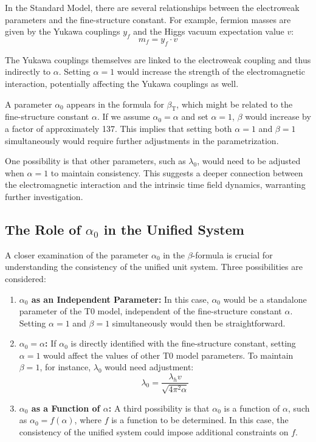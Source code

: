 ﻿\documentclass[12pt,a4paper]{article}
\newcommand{\betaT}{\beta_{\text{T}}}
\begin{document}
	In the Standard Model, there are several relationships between the electroweak parameters and the fine-structure constant. For example, fermion masses are given by the Yukawa couplings \(y_f\) and the Higgs vacuum expectation value \(v\):
	\begin{equation}
		m_f = y_f \cdot v
	\end{equation}
	
	The Yukawa couplings themselves are linked to the electroweak coupling and thus indirectly to \(\alpha\). Setting \(\alpha = 1\) would increase the strength of the electromagnetic interaction, potentially affecting the Yukawa couplings as well.
	
	A parameter \(\alpha_0\) appears in the formula for \(\betaT\), which might be related to the fine-structure constant \(\alpha\). If we assume \(\alpha_0 = \alpha\) and set \(\alpha = 1\), \(\beta\) would increase by a factor of approximately 137. This implies that setting both \(\alpha = 1\) and \(\beta = 1\) simultaneously would require further adjustments in the parametrization.
	
	One possibility is that other parameters, such as \(\lambda_0\), would need to be adjusted when \(\alpha = 1\) to maintain consistency. This suggests a deeper connection between the electromagnetic interaction and the intrinsic time field dynamics, warranting further investigation.
	
	\subsection{The Role of \(\alpha_0\) in the Unified System}
	
	A closer examination of the parameter \(\alpha_0\) in the \(\beta\)-formula is crucial for understanding the consistency of the unified unit system. Three possibilities are considered:
	
	\begin{enumerate}
		\item \textbf{\(\alpha_0\) as an Independent Parameter:} In this case, \(\alpha_0\) would be a standalone parameter of the T0 model, independent of the fine-structure constant \(\alpha\). Setting \(\alpha = 1\) and \(\beta = 1\) simultaneously would then be straightforward.
		
		\item \textbf{\(\alpha_0 = \alpha\):} If \(\alpha_0\) is directly identified with the fine-structure constant, setting \(\alpha = 1\) would affect the values of other T0 model parameters. To maintain \(\beta = 1\), for instance, \(\lambda_0\) would need adjustment:
		\begin{equation}
			\lambda_0 = \frac{\lambda_h v}{\sqrt{4\pi^2 \alpha}}
		\end{equation}
		
		\item \textbf{\(\alpha_0\) as a Function of \(\alpha\):} A third possibility is that \(\alpha_0\) is a function of \(\alpha\), such as \(\alpha_0 = f(\alpha)\), where \(f\) is a function to be determined. In this case, the consistency of the unified system could impose additional constraints on \(f\).
	\end{enumerate}
	
\end{document}

